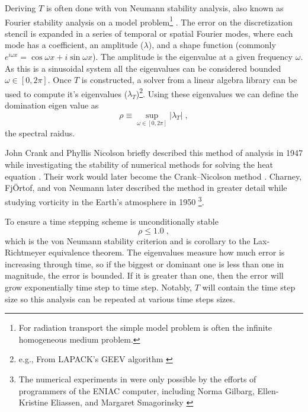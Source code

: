 Deriving $T$ is often done with von Neumann stability analysis, also known as Fourier stability analysis on a model problem\footnote{For radiation transport the simple model problem is often the infinite homogeneous medium problem.} \cite{leveque2007finite}.
The error on the discretization stencil is expanded in a series of temporal or spatial Fourier modes, where each mode has a coefficient, an amplitude ($\lambda$), and a shape function (commonly $e^{i\omega x}=\cos{\omega x} + i\sin{\omega x}$).
The amplitude is the eigenvalue at a given frequency $\omega$.
As this is a sinusoidal system all the eigenvalues can be considered bounded $\omega \in [0, 2\pi]$.
Once $T$ is constructed, a solver from a linear algebra library can be used to compute it's eigenvalues ($\lambda_T$)\footnote{e.g., From LAPACK's GEEV algorithm \cite{laug}}.
Using these eigenvalues we can define the domination eigen value as
\begin{equation}
    \rho \equiv \sup_{\omega\in[0,2\pi]}|\lambda_T| \; ,
\end{equation}
the spectral raidus.

John Crank and Phyllis Nicolson briefly described this method of analysis in 1947 while investigating the stability of numerical methods for solving the heat equation \cite{nicolson_phd}.
Their work would later become the Crank--Nicolson method \cite{Crank_Nicolson_1947}.
Charney, FjÖrtof, and von Neumann later described the method in greater detail while studying vorticity in the Earth's atmosphere in 1950 \cite{charney_1950_stabilityAnylisys}\footnote{The numerical experiments in \cite{charney_1950_stabilityAnylisys} were only possible by the efforts of programmers of the ENIAC computer, including Norma Gilbarg, Ellen-Kristine Eliassen, and Margaret Smagorinsky \cite{switman_2017_unheralded}}.

To ensure a time stepping scheme is unconditionally stable
\begin{equation}
    \rho \leq 1.0 \; ,
\end{equation}
which is the {von Neumann stability criterion} and is corollary to the {Lax-Richtmeyer} equivalence theorem.
The eigenvalues measure how much error is increasing through time, so if the biggest or dominant one is less than one in magnitude, the error is bounded.
If it is greater than one, then the error will grow exponentially time step to time step.
Notably, ${T}$ will contain the time step size so this analysis can be repeated at various time steps sizes.

